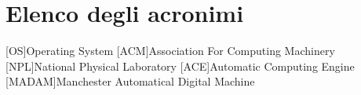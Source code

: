\chapter{Elenco degli acronimi}
\begin{acronym}
	[OS]{Operating System}
	[ACM]{Association For Computing Machinery}
	[NPL]{National Physical Laboratory}
	[ACE]{Automatic Computing Engine}
	[MADAM]{Manchester Automatical Digital Machine}
\end{acronym}